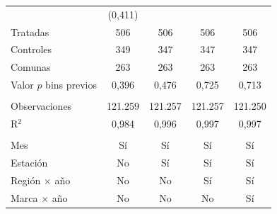 \begin{tabular}{lcccc}
                          & (0{,}411)        &                &                &   \\   
   Tratadas               & 506            & 506            & 506            & 506\\  
   Controles              & 349            & 347            & 347            & 347\\  
   Comunas                & 263            & 263            & 263            & 263\\  
   Valor $p$ bins previos & 0{,}396          & 0{,}476          & 0{,}725          & 0{,}713\\  
    \\
   Observaciones          & 121.259        & 121.257        & 121.257        & 121.250\\  
   R$^2$                  & 0{,}984          & 0{,}996          & 0{,}997          & 0{,}997\\  
    \\
   Mes                    & Sí             & Sí             & Sí             & Sí\\  
   Estación               & No             & Sí             & Sí             & Sí\\  
   Región $\times$ año    & No             & No             & Sí             & Sí\\  
   Marca $\times$ año     & No             & No             & No             & Sí\\  
   \bottomrule
\end{tabular}
\par\endgroup
